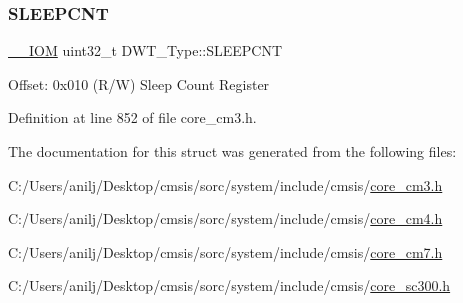 \subsubsection{\texorpdfstring{S\+L\+E\+E\+P\+C\+NT}{SLEEPCNT}}
{\footnotesize\ttfamily \hyperlink{core__sc300_8h_ab6caba5853a60a17e8e04499b52bf691}{\+\_\+\+\_\+\+I\+OM} uint32\+\_\+t D\+W\+T\+\_\+\+Type\+::\+S\+L\+E\+E\+P\+C\+NT}

Offset\+: 0x010 (R/W) Sleep Count Register 

Definition at line 852 of file core\+\_\+cm3.\+h.



The documentation for this struct was generated from the following files\+:\begin{DoxyCompactItemize}
\item 
C\+:/\+Users/anilj/\+Desktop/cmsis/sorc/system/include/cmsis/\hyperlink{core__cm3_8h}{core\+\_\+cm3.\+h}\item 
C\+:/\+Users/anilj/\+Desktop/cmsis/sorc/system/include/cmsis/\hyperlink{core__cm4_8h}{core\+\_\+cm4.\+h}\item 
C\+:/\+Users/anilj/\+Desktop/cmsis/sorc/system/include/cmsis/\hyperlink{core__cm7_8h}{core\+\_\+cm7.\+h}\item 
C\+:/\+Users/anilj/\+Desktop/cmsis/sorc/system/include/cmsis/\hyperlink{core__sc300_8h}{core\+\_\+sc300.\+h}\end{DoxyCompactItemize}
